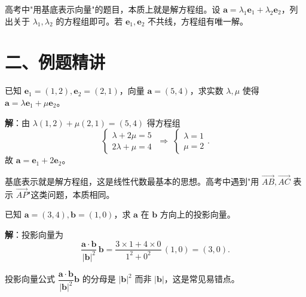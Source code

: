 \documentclass[12pt, a4paper]{ctexart}
\begin{document}
\begin{tipbox}[规律总结]
高考中"用基底表示向量"的题目，本质上就是解方程组。设 $\boldsymbol{a}=\lambda_1\boldsymbol{e}_1+\lambda_2\boldsymbol{e}_2$，列出关于 $\lambda_1,\lambda_2$ 的方程组即可。若 $\boldsymbol{e}_1,\boldsymbol{e}_2$ 不共线，方程组有唯一解。
\end{tipbox}

\section*{\textcolor{examorange}{二、例题精讲}}

\begin{examplebox}[【例题1】基底表示与方程组]
已知 $\boldsymbol{e}_1=(1,2),\boldsymbol{e}_2=(2,1)$，向量 $\boldsymbol{a}=(5,4)$，求实数 $\lambda,\mu$ 使得 $\boldsymbol{a}=\lambda\boldsymbol{e}_1+\mu\boldsymbol{e}_2$。
\end{examplebox}

\noindent\textbf{解}：由 $\lambda(1,2)+\mu(2,1)=(5,4)$ 得方程组
\[
  \begin{cases}\lambda+2\mu=5\\2\lambda+\mu=4\end{cases}
  \;\Longrightarrow\;
  \begin{cases}\lambda=1\\\mu=2\end{cases}.
\]
故 $\boldsymbol{a}=\boldsymbol{e}_1+2\boldsymbol{e}_2$。

\begin{tipbox}[方法总结]
基底表示就是解方程组，这是线性代数最基本的思想。高考中遇到"用 $\overrightarrow{AB},\overrightarrow{AC}$ 表示 $\overrightarrow{AP}$"这类问题，本质相同。
\end{tipbox}

\vspace{6pt}

\begin{examplebox}[【例题2】投影向量的计算]
已知 $\boldsymbol{a}=(3,4),\boldsymbol{b}=(1,0)$，求 $\boldsymbol{a}$ 在 $\boldsymbol{b}$ 方向上的投影向量。
\end{examplebox}

\noindent\textbf{解}：投影向量为
\[
  \frac{\boldsymbol{a}\cdot\boldsymbol{b}}{|\boldsymbol{b}|^2}\,\boldsymbol{b}
  =\frac{3\times1+4\times0}{1^2+0^2}\,(1,0)=(3,0).
\]

\begin{tipbox}[方法总结]
投影向量公式 $\dfrac{\boldsymbol{a}\cdot\boldsymbol{b}}{|\boldsymbol{b}|^2}\boldsymbol{b}$ 的分母是 $|\boldsymbol{b}|^2$ 而非 $|\boldsymbol{b}|$，这是常见易错点。
\end{tipbox}
\end{document}
